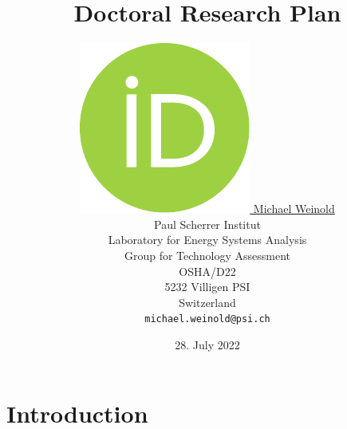 \documentclass{article}
\title{Doctoral Research Plan}
\author{
    \href{https://orcid.org/0000-0003-4859-2650}
    {\includegraphics[scale=0.06]{orcid.pdf}
    \hspace{1mm}
    Michael Weinold} \\
	Paul Scherrer Institut\\
	Laboratory for Energy Systems Analysis\\
	Group for Technology Assessment\\
	OSHA/D22\\
    5232 Villigen PSI \\
    Switzerland \\
	\texttt{michael.weinold@psi.ch} \\
}
\date{28. July 2022}
\begin{document}
\maketitle

\begin{abstract}
	\cite{becattini_role_2021}
\end{abstract}


\section{Introduction}




\end{document}
